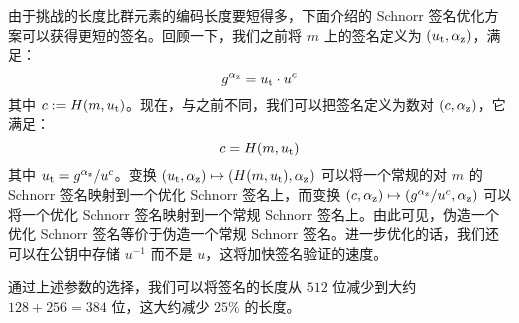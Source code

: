 由于挑战的长度比群元素的编码长度要短得多，下面介绍的 Schnorr 签名优化方案可以获得更短的签名。回顾一下，我们之前将 $m$ 上的签名定义为 $(u_{\rm t},\alpha_{\rm z})$，满足：
$$
g^{\alpha_{\rm z}}=u_{\rm t}\cdot u^c
$$
其中 $c:=H(m,u_{\rm t})$。现在，与之前不同，我们可以把签名定义为数对 $(c,\alpha_{\rm z})$，它满足：
$$
c=H(m,u_{\rm t})
$$
其中 $u_{\rm t}={g^{\alpha_{\rm z}}}/{u^c}$。变换 $(u_{\rm t},\alpha_{\rm z})\mapsto(H(m,u_{\rm t}),\alpha_{\rm z})$ 可以将一个常规的对 $m$ 的 Schnorr 签名映射到一个优化 Schnorr 签名上，而变换 $(c,\alpha_{\rm z})\mapsto({g^{\alpha_{\rm z}}}/{u^c},\alpha_{\rm z})$ 可以将一个优化 Schnorr 签名映射到一个常规 Schnorr 签名上。由此可见，伪造一个优化 Schnorr 签名等价于伪造一个常规 Schnorr 签名。进一步优化的话，我们还可以在公钥中存储 $u^{-1}$ 而不是 $u$，这将加快签名验证的速度。

通过上述参数的选择，我们可以将签名的长度从 $512$ 位减少到大约 $128+256=384$ 位，这大约减少 $25\%$ 的长度。
